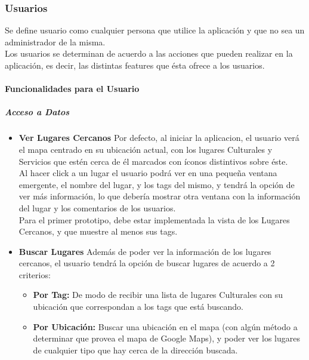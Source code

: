 \documentclass[10pt,letterpaper]{article}
\begin{document}
\subsubsection{Usuarios}

Se define usuario como cualquier persona que utilice la aplicación y que no sea un administrador de la misma.\\

Los usuarios se determinan de acuerdo a las acciones que pueden realizar en la aplicación, es decir, las distintas features que ésta ofrece a los usuarios.\\

\paragraph{Funcionalidades para el Usuario}

\subparagraph{Acceso a Datos}
\begin{itemize}
 \item \textbf{Ver Lugares Cercanos} Por defecto, al iniciar la aplicacion, el usuario verá el mapa centrado en su ubicación actual, con los lugares Culturales y Servicios que estén cerca de él marcados con íconos distintivos sobre éste.\\

Al hacer click a un lugar el usuario podrá ver en una pequeña ventana emergente, el nombre del lugar, y los tags del mismo, y tendrá la opción de ver más información, lo que debería mostrar otra ventana con la información del lugar y los comentarios de los usuarios.\\

Para el primer prototipo, debe estar implementada la vista de los Lugares Cercanos, y que muestre al menos sus tags.\\

 \item \textbf{Buscar Lugares} Además de poder ver la información de los lugares cercanos, el usuario tendrá la opción de buscar lugares de acuerdo a 2 criterios:\\

\begin{itemize}
\item \textbf{Por Tag:} De modo de recibir una lista de lugares Culturales con su ubicación que correspondan a los tags que está buscando.
\item \textbf{Por Ubicación:} Buscar una ubicación en el mapa (con algún método a determinar que provea el mapa de Google Maps), y poder ver los lugares de cualquier tipo que hay cerca de la dirección buscada.
\end{itemize}
\end{itemize}
\end{document}
